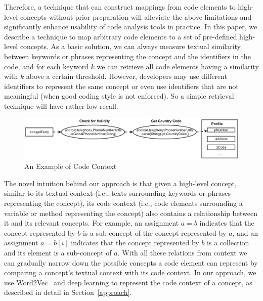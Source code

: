 Therefore, a technique that can construct mappings from code elements to high-level concepts without prior preparation will alleviate the above limitations and significantly enhance usability of code analysis tools in practice. In this paper, we describe a technique to map arbitrary code elements to a set of pre-defined high-level concepts. As a basic solution, we can always measure textual similarity between keywords or phrases representing the concept and the identifiers in the code, and for each keyword $k$ we can retrieve all code elements having a similarity with $k$ above a certain threshold. However, developers may use different identifiers to represent the same concept or even use identifiers that are not meaningful (when good coding style is not enforced). So a simple retrieval technique will have rather low recall.

\begin{figure}
	\centering
	\includegraphics[scale=.2]{figures/example_computationOld.png}
	\vspace{-.6cm}

	\caption{An Example of Code Context}
	\vspace{-.6cm}

	\label{example}
\end{figure}


The novel intuition behind our approach is that given a high-level concept, similar to its textual context (i.e., texts surrounding keywords or phrases representing the concept), its code context (i.e., code elements surrounding a variable or method representing the concept) also contains a relationship between it and its relevant concepts. For example, an assignment $a = b$ indicates that the concept represented by $b$ is a sub-concept of the concept represented by $a$, and an assignment $a = b[i]$ indicates that the concept represented by $b$ is a collection and its element is a sub-concept of $a$. With all these relations from context we can gradually narrow down the possible concepts a code element c{\tiny }an represent by comparing a concept's textual context with its code context. In our approach, we use Word2Vec~\cite{mikolov2013efficient} and deep learning to represent the code context of a concept, as described in detail in Section~\ref{approach}.

